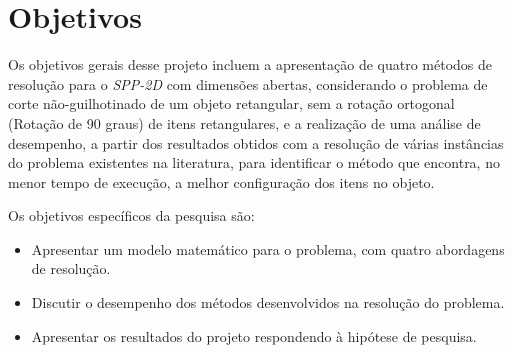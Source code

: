 \section{Objetivos}

    Os objetivos gerais desse projeto incluem a apresentação de quatro métodos de resolução para o \emph{SPP-2D} com dimensões abertas, considerando o problema de corte não-guilhotinado de um objeto retangular, sem a rotação ortogonal (Rotação de 90 graus) de itens retangulares, e a realização de uma análise de desempenho, a partir dos resultados obtidos com a resolução de várias instâncias do problema existentes na literatura, para identificar o método que encontra, no menor tempo de execução, a melhor configuração dos itens no objeto.
    
    
    \newpage
    Os objetivos específicos da pesquisa são:
    
    \begin{itemize} %
        \item Apresentar um modelo matemático para o problema, com quatro abordagens de resolução.
        \item Discutir o desempenho dos métodos desenvolvidos na resolução do problema.
        \item Apresentar os resultados do projeto respondendo à hipótese de pesquisa.
    \end{itemize}